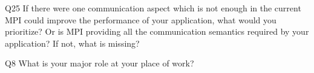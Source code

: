 \begin{description}%
\item{Q25} If there were one communication aspect which is not enough in the current MPI could improve the performance of your application, what would you prioritize? Or is MPI providing all the communication semantics required by your application? If not, what is missing?%
\item{Q8} What is your major role at your place of work?%
\end{description}%
